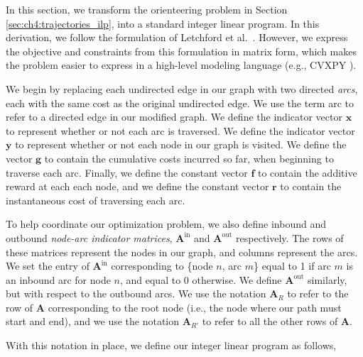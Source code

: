 In this section, we transform the orienteering problem in Section \ref{sec:ch4:trajectories_ilp}, into a standard integer linear program.
In this derivation, we follow the formulation of Letchford et al.~\cite{letchford:2013}.
However, we express the objective and constraints from this formulation in matrix form, which makes the problem easier to express in a high-level modeling language (e.g., CVXPY \cite{cvxpy:2016}).

We begin by replacing each undirected edge in our graph with two directed \emph{arcs}, each with the same cost as the original undirected edge.
We use the term arc to refer to a directed edge in our modified graph.
We define the indicator vector $\mathbf{x}$ to represent whether or not each arc is traversed.
We define the indicator vector $\mathbf{y}$ to represent whether or not each node in our graph is visited.
We define the vector $\mathbf{g}$ to contain the cumulative costs incurred so far, when beginning to traverse each arc.
Finally, we define the constant vector $\mathbf{f}$ to contain the additive reward at each each node, and we define the constant vector $\mathbf{r}$ to contain the instantaneous cost of traversing each arc.

To help coordinate our optimization problem, we also define inbound and outbound \emph{node-arc indicator matrices}, $\mathbf{A}^{\text{in}}$ and $\mathbf{A}^{\text{out}}$ respectively.
The rows of these matrices represent the nodes in our graph, and columns represent the arcs.
We set the entry of $\mathbf{A}^{\text{in}}$ corresponding to \{node $n$, arc $m$\} equal to 1 if arc $m$ is an inbound arc for node $n$, and equal to 0 otherwise. 
We define $\mathbf{A}^{\text{out}}$ similarly, but with respect to the outbound arcs.
We use the notation $\mathbf{A}_{R}$ to refer to the row of $\mathbf{A}$ corresponding to the root node (i.e., the node where our path must start and end), and we use the notation $\mathbf{A}_{R'}$ to refer to all the other rows of $\mathbf{A}$.

With this notation in place, we define our integer linear program as follows,

\pagebreak

